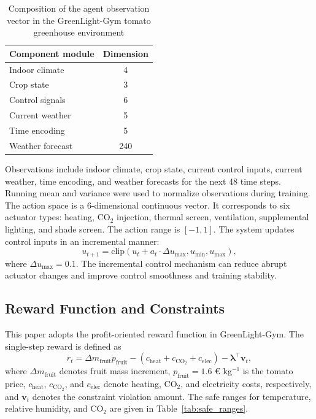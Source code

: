 \documentclass[number,preprint,review,12pt]{elsarticle}
\begin{document}
\begin{table}[H]
\centering
\caption{Composition of the agent observation vector in the GreenLight-Gym tomato greenhouse environment}
\label{tab:state_space}
\begin{tabular}{lc}
\toprule
Component module & Dimension \\
\midrule
Indoor climate & 4 \\
Crop state & 3 \\
Control signals & 6 \\
Current weather & 5 \\
Time encoding & 5 \\
Weather forecast & 240 \\
\bottomrule
\end{tabular}
\end{table}

Observations include indoor climate, crop state, current control inputs, current weather, time encoding, and weather forecasts for the next 48 time steps. Running mean and variance were used to normalize observations during training. The action space is a 6-dimensional continuous vector. It corresponds to six actuator types: heating, CO$_2$ injection, thermal screen, ventilation, supplemental lighting, and shade screen. The action range is $[-1, 1]$. The system updates control inputs in an incremental manner:
\begin{equation}
u_{t+1} = \mathrm{clip}(u_t + a_t \cdot \Delta u_{\max}, u_{\min}, u_{\max}),
\end{equation}
where $\Delta u_{\max}=0.1$. The incremental control mechanism can reduce abrupt actuator changes and improve control smoothness and training stability.

\subsection{Reward Function and Constraints}
This paper adopts the profit-oriented reward function in GreenLight-Gym. The single-step reward is defined as
\begin{equation}
r_t = \Delta m_{\mathrm{fruit}} p_{\mathrm{fruit}} - (c_{\mathrm{heat}} + c_{\mathrm{CO}_2} + c_{\mathrm{elec}}) - \boldsymbol{\lambda}^{\top}\boldsymbol{v}_t,
\end{equation}
where $\Delta m_{\mathrm{fruit}}$ denotes fruit mass increment, $p_{\mathrm{fruit}}=1.6$ € kg$^{-1}$ is the tomato price, $c_{\mathrm{heat}}$, $c_{\mathrm{CO}_2}$, and $c_{\mathrm{elec}}$ denote heating, CO$_2$, and electricity costs, respectively, and $\boldsymbol{v}_t$ denotes the constraint violation amount. The safe ranges for temperature, relative humidity, and CO$_2$ are given in Table~\ref{tab:safe_ranges}.
\end{document}
